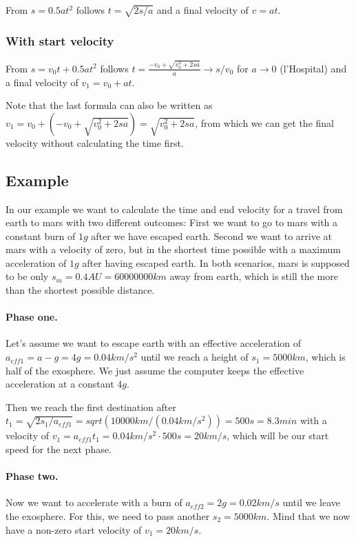 \documentclass[10pt]{article}
\begin{document}
	From $s = 0.5at^2$ follows $t = \sqrt{2s/a}$ and a final velocity of $v=at$.
	
	\subsubsection{With start velocity}
	
	From $s = v_0t + 0.5at^2$ follows $t = \frac{-v_0 + \sqrt{v^2_0 + 2sa}}{a} \rightarrow s/v_0$ for $a\rightarrow0$ (l'Hospital) and a final velocity of $v_1 = v_0 + at$.
	
	Note that the last formula can also be written as $v_1=v_0 + (-v_0 + \sqrt{v^2_0+2sa}) = \sqrt{v^2_0+2sa}$, from which we can get the final velocity without calculating the time first.
	
	\subsection{Example}
	
	In our example we want to calculate the time and end velocity for a travel from earth to mars with two different outcomes: First we want to go to mars with a constant burn of $1g$ after we have escaped earth. Second we want to arrive at mars with a velocity of zero, but in the shortest time possible with a maximum acceleration of $1g$ after having escaped earth. In both scenarios, mars is supposed to be only $s_m = 0.4 AU = 60 000 000 km$ away from earth, which is still the more than the shortest possible distance.
	
	\paragraph{Phase one.}
	Let's assume we want to escape earth with an effective acceleration of $a_{eff1} = a-g = 4g = 0.04 km/s^2$ until we reach a height of $s_1=5000 km$, which is half of the exosphere. We just assume the computer keeps the effective acceleration at a constant $4g$.
	
	Then we reach the first destination after $t_1 = \sqrt{2s_1/a_{eff1}} = sqrt(10000km/(0.04km/s^2)) = 500 s = 8.3 min$ with a velocity of $v_1=a_{eff1}t_1=0.04km/s^2\cdot 500s = 20 km/s$, which will be our start speed for the next phase.
	
	\paragraph{Phase two.}
	Now we want to accelerate with a burn of $a_{eff2}=2g=0.02km/s$ until we leave the exosphere. For this, we need to pass another $s_2=5000km$. Mind that we now have a non-zero start velocity of $v_1 = 20 km/s$.
	
\end{document}
